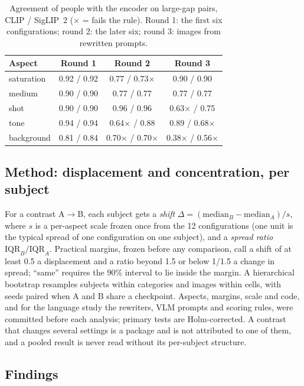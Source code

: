 \documentclass[review]{vgtc}                 %
\begin{document}
\begin{table}[tb]
\caption{Agreement of people with the encoder on large-gap pairs, CLIP / SigLIP~2 ($\times$ = fails the rule). Round 1: the first six configurations; round 2: the later six; round 3: images from rewritten prompts.}
\label{tab:validity}
\scriptsize\centering
\begin{tabular}{@{}lccc@{}}
\toprule
Aspect & Round 1 & Round 2 & Round 3 \\
\midrule
saturation & 0.92 / 0.92 & 0.77 / 0.73$\times$ & 0.90 / 0.90 \\
medium & 0.90 / 0.90 & 0.77 / 0.77 & 0.77 / 0.77 \\
shot & 0.90 / 0.90 & 0.96 / 0.96 & 0.63$\times$ / 0.75 \\
tone & 0.94 / 0.94 & 0.64$\times$ / 0.88 & 0.89 / 0.68$\times$ \\
background & 0.81 / 0.84 & 0.70$\times$ / 0.70$\times$ & 0.38$\times$ / 0.56$\times$ \\
\bottomrule
\end{tabular}
\end{table}

\subsection{Method: displacement and concentration, per subject}
For a contrast A$\rightarrow$B, each subject gets a \emph{shift} $\Delta = (\mathrm{median}_B - \mathrm{median}_A)/s$, where $s$ is a per-aspect scale frozen once from the 12 configurations (one unit is the typical spread of one configuration on one subject), and a \emph{spread ratio} $\mathrm{IQR}_B/\mathrm{IQR}_A$. Practical margins, frozen before any comparison, call a shift of at least 0.5 a displacement and a ratio beyond 1.5 or below 1/1.5 a change in spread; ``same'' requires the 90\% interval to lie inside the margin. A hierarchical bootstrap resamples subjects within categories and images within cells, with seeds paired when A and B share a checkpoint. Aspects, margins, scale and code, and for the language study the rewriters, VLM prompts and scoring rules, were committed before each analysis; primary tests are Holm-corrected. A contrast that changes several settings is a package and is not attributed to one of them, and a pooled result is never read without its per-subject structure.

\subsection{Findings}
\end{document}
